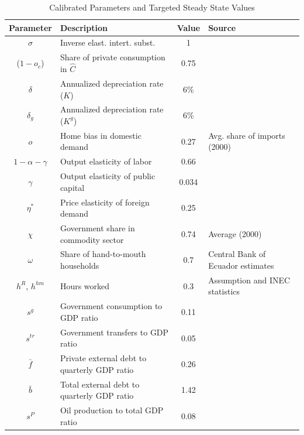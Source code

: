 \documentclass[12pt]{article}
\begin{document}
\begin{table}
\begin{footnotesize}
\begin{center}
    \caption{Calibrated Parameters and Targeted Steady State Values}\label{table:steadystatecalibration}
    \begin{tabular}{c l c l}
        \hline
        Parameter & Description & Value & Source \\ \hline
        $\sigma$ & Inverse elast. intert. subst. & 1 & \citet{MedinaSoto2016} \\
        ($1-o_c$) & Share of private consumption in $\hat{C}$ & 0.75 & \citet{coenen2013gauging} \\
        $\delta$ & Annualized depreciation rate ($K$) & 6\% & \citet{MedinaSoto2016} \\
        $\delta_g$ & Annualized depreciation rate ($K^g$) & 6\% & \citet{coenen2013gauging} \\
        $o$ & Home bias in domestic demand & 0.27 & Avg. share of imports (2000\textendash2019) \\
        $1-\alpha-\gamma$ & Output elasticity of labor & 0.66 & \citet{MedinaSoto2016} \\
        $\gamma$ & Output elasticity of public capital & 0.034 & \citet{coenen2013gauging} \\
        $\eta^*$ & Price elasticity of foreign demand & 0.25 & \citet{pelaez2020elasticidades} \\
        $\chi$ & Government share in commodity sector & 0.74 & Average (2000\textendash 2019) \\
        $\omega$ & Share of hand-to-mouth households & 0.7 & Central Bank of Ecuador estimates \\
        $h^R$, $h^{hm}$ & Hours worked & 0.3 & Assumption and INEC statistics\\
        \hline
        $s^g$ & Government consumption to GDP ratio & 0.11 & \citet{oner2022imf} \\
        $s^{tr}$ & Government transfers to GDP ratio & 0.05 & \citet{oner2022imf} \\
        $\bar{f}$ & Private external debt to quarterly GDP ratio & 0.26 & \citet{oner2022imf} \\
        $\bar{b}$ & Total external debt to quarterly GDP ratio & 1.42 & \citet{oner2022imf} \\
        $s^P$ & Oil production to total GDP ratio & 0.08 & \citet{oner2022imf} \\

\end{tabular}
\end{center}
\end{footnotesize}
\end{table}
\end{document}

